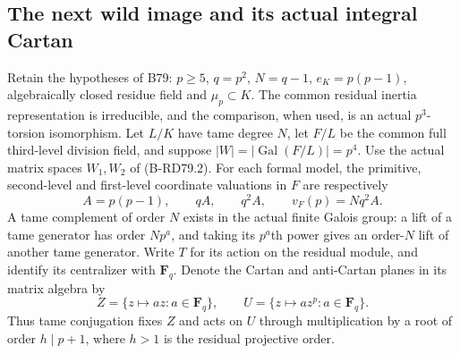 \subsection{The next wild image and its actual integral Cartan}

Retain the hypotheses of B79: \(p\ge5\), \(q=p^2\), \(N=q-1\),
\(e_K=p(p-1)\), algebraically closed residue field and \(\mu_p\subset K\).
The common residual inertia representation is irreducible, and the
comparison, when used, is an actual \(p^3\)-torsion isomorphism.
Let \(L/K\) have tame degree \(N\), let \(F/L\) be the common full
third-level division field, and suppose \(|W|=|\operatorname{Gal}(F/L)|=p^4\).
Use the actual matrix spaces \(W_1,W_2\) of (B-RD79.2).
For each formal model, the primitive, second-level and first-level
coordinate valuations in \(F\) are respectively
\[
 A=p(p-1),\qquad qA,\qquad q^2A,
                 \qquad v_F(p)=Nq^2A.                 \tag{B-RD80.1}
\]
A tame complement of order \(N\) exists in the actual finite
Galois group: a lift of a tame generator has order \(Np^a\),
and taking its \(p^a\)th power gives an order-\(N\) lift of
another tame generator. Write \(T\) for its action on the residual module,
and identify its centralizer with \(\mathbf F_q\). Denote the
Cartan and anti-Cartan planes in its matrix algebra by
\[
 Z=\{z\mapsto az:a\in\mathbf F_q\},\qquad
 U=\{z\mapsto az^p:a\in\mathbf F_q\}.
\]
Thus tame conjugation fixes \(Z\) and acts on \(U\) through
multiplication by a root of order \(h\mid p+1\), where \(h>1\)
is the residual projective order.


